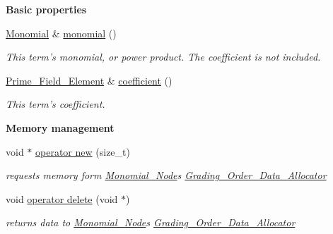 \begin{Indent}\textbf{ Basic properties}\par
\begin{DoxyCompactItemize}
\item 
\mbox{\label{class_monomial___node_ae2de10486486a056aa860ae8f133c309}} 
\hyperlink{class_monomial}{Monomial} \& \hyperlink{class_monomial___node_ae2de10486486a056aa860ae8f133c309}{monomial} ()
\begin{DoxyCompactList}\small\item\em This term's monomial, or power product. The coefficient is not included. \end{DoxyCompactList}\item 
\mbox{\label{class_monomial___node_a9eaedcc01e0c081565981450d08379f4}} 
\hyperlink{class_prime___field___element}{Prime\+\_\+\+Field\+\_\+\+Element} \& \hyperlink{class_monomial___node_a9eaedcc01e0c081565981450d08379f4}{coefficient} ()
\begin{DoxyCompactList}\small\item\em This term's coefficient. \end{DoxyCompactList}\end{DoxyCompactItemize}
\end{Indent}
\begin{Indent}\textbf{ Memory management}\par
\begin{DoxyCompactItemize}
\item 
\mbox{\label{class_monomial___node_a556f9f54dca0f5407ec03c2ee88bac4b}} 
void $\ast$ \hyperlink{class_monomial___node_a556f9f54dca0f5407ec03c2ee88bac4b}{operator new} (size\+\_\+t)
\begin{DoxyCompactList}\small\item\em requests memory form \hyperlink{class_monomial___node}{Monomial\+\_\+\+Node}\textquotesingle{}s \hyperlink{class_grading___order___data___allocator}{Grading\+\_\+\+Order\+\_\+\+Data\+\_\+\+Allocator} \end{DoxyCompactList}\item 
\mbox{\label{class_monomial___node_ae954b3ac41cf1c05b64c9b7f3c3d84a5}} 
void \hyperlink{class_monomial___node_ae954b3ac41cf1c05b64c9b7f3c3d84a5}{operator delete} (void $\ast$)
\begin{DoxyCompactList}\small\item\em returns data to \hyperlink{class_monomial___node}{Monomial\+\_\+\+Node}\textquotesingle{}s \hyperlink{class_grading___order___data___allocator}{Grading\+\_\+\+Order\+\_\+\+Data\+\_\+\+Allocator} \end{DoxyCompactList}\end{DoxyCompactItemize}
\end{Indent}
